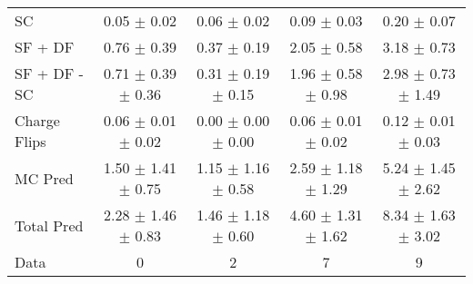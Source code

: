 \begin{tabular}{l|cccc}
                                 SC &  0.05 $\pm$  0.02 &  0.06 $\pm$  0.02 &  0.09 $\pm$  0.03 &  0.20 $\pm$  0.07 \\
                            SF + DF &  0.76 $\pm$  0.39 &  0.37 $\pm$  0.19 &  2.05 $\pm$  0.58 &  3.18 $\pm$  0.73 \\
\hline
                       SF + DF - SC &  0.71 $\pm$  0.39 $\pm$  0.36 &  0.31 $\pm$  0.19 $\pm$  0.15 &  1.96 $\pm$  0.58 $\pm$  0.98 &  2.98 $\pm$  0.73 $\pm$  1.49 \\
\hline\hline
                       Charge Flips &  0.06 $\pm$  0.01 $\pm$  0.02 &  0.00 $\pm$  0.00 $\pm$  0.00 &  0.06 $\pm$  0.01 $\pm$  0.02 &  0.12 $\pm$  0.01 $\pm$  0.03 \\
\hline
                            MC Pred &  1.50 $\pm$  1.41 $\pm$  0.75 &  1.15 $\pm$  1.16 $\pm$  0.58 &  2.59 $\pm$  1.18 $\pm$  1.29 &  5.24 $\pm$  1.45 $\pm$  2.62 \\
\hline
                         Total Pred &  2.28 $\pm$  1.46 $\pm$  0.83 &  1.46 $\pm$  1.18 $\pm$  0.60 &  4.60 $\pm$  1.31 $\pm$  1.62 &  8.34 $\pm$  1.63 $\pm$  3.02 \\
\hline\hline
                               Data &     0 &     2 &     7 &     9 \\
\hline\hline
\end{tabular}

